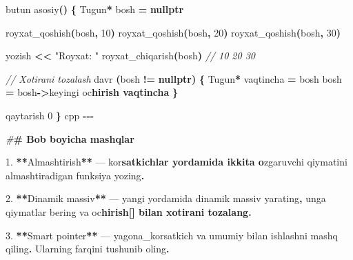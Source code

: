 \documentclass[a4paper,11pt,twoside,openright]{book}
\newenvironment{Shaded}{\begin{snugshade}}{\end{snugshade}}
\newcommand{\CharTok}[1]{\textcolor[rgb]{0.31,0.60,0.02}{#1}}
\newcommand{\CommentTok}[1]{\textcolor[rgb]{0.56,0.35,0.01}{\textit{#1}}}
\newcommand{\DecValTok}[1]{\textcolor[rgb]{0.00,0.00,0.81}{#1}}
\newcommand{\ErrorTok}[1]{\textcolor[rgb]{0.64,0.00,0.00}{\textbf{#1}}}
\newcommand{\FloatTok}[1]{\textcolor[rgb]{0.00,0.00,0.81}{#1}}
\newcommand{\KeywordTok}[1]{\textcolor[rgb]{0.13,0.29,0.53}{\textbf{#1}}}
\newcommand{\NormalTok}[1]{#1}
\newcommand{\OperatorTok}[1]{\textcolor[rgb]{0.81,0.36,0.00}{\textbf{#1}}}
\newcommand{\PreprocessorTok}[1]{\textcolor[rgb]{0.56,0.35,0.01}{\textit{#1}}}
\newcommand{\StringTok}[1]{\textcolor[rgb]{0.31,0.60,0.02}{#1}}
\begin{document}
\begin{Shaded}
\begin{Highlighting}[]
\NormalTok{butun asosiy}\OperatorTok{()} \OperatorTok{\{}
\NormalTok{    Tugun}\OperatorTok{*}\NormalTok{ bosh }\OperatorTok{=} \KeywordTok{nullptr}

\NormalTok{    royxat\_qoshish}\OperatorTok{(}\NormalTok{bosh}\OperatorTok{,} \DecValTok{10}\OperatorTok{)}
\NormalTok{    royxat\_qoshish}\OperatorTok{(}\NormalTok{bosh}\OperatorTok{,} \DecValTok{20}\OperatorTok{)}
\NormalTok{    royxat\_qoshish}\OperatorTok{(}\NormalTok{bosh}\OperatorTok{,} \DecValTok{30}\OperatorTok{)}

\NormalTok{    yozish }\OperatorTok{\textless{}\textless{}} \StringTok{"Ro\textquotesingle{}yxat: "}
\NormalTok{    royxat\_chiqarish}\OperatorTok{(}\NormalTok{bosh}\OperatorTok{)}   \CommentTok{// 10 20 30}

    \CommentTok{// Xotirani tozalash}
\NormalTok{    davr }\OperatorTok{(}\NormalTok{bosh }\OperatorTok{!=} \KeywordTok{nullptr}\OperatorTok{)} \OperatorTok{\{}
\NormalTok{        Tugun}\OperatorTok{*}\NormalTok{ vaqtincha }\OperatorTok{=}\NormalTok{ bosh}
\NormalTok{        bosh }\OperatorTok{=}\NormalTok{ bosh}\OperatorTok{{-}\textgreater{}}\NormalTok{keyingi}
\NormalTok{        o}\CharTok{\textquotesingle{}c}\ErrorTok{hirish vaqtincha}
    \OperatorTok{\}}

\NormalTok{    qaytarish }\DecValTok{0}
\OperatorTok{\}}
\ErrorTok{\textasciigrave{}\textasciigrave{}\textasciigrave{}}\NormalTok{cpp}
\OperatorTok{{-}{-}{-}}

\PreprocessorTok{\#}\ErrorTok{\# Bob bo\textquotesingle{}yicha mashqlar}

\FloatTok{1.} \OperatorTok{**}\NormalTok{Almashtirish}\OperatorTok{**}\NormalTok{ — ko}\CharTok{\textquotesingle{}r}\ErrorTok{satkichlar yordamida ikkita o}\CharTok{\textquotesingle{}}\NormalTok{zgaruvchi qiymatini almashtiradigan funksiya yozing}\OperatorTok{.}

\FloatTok{2.} \OperatorTok{**}\NormalTok{Dinamik massiv}\OperatorTok{**}\NormalTok{ — }\ErrorTok{\textasciigrave{}}\NormalTok{yangi}\ErrorTok{\textasciigrave{}}\NormalTok{ yordamida dinamik massiv yarating}\OperatorTok{,}\NormalTok{ unga qiymatlar bering va }\ErrorTok{\textasciigrave{}}\NormalTok{o}\CharTok{\textquotesingle{}c}\ErrorTok{hirish[]\textasciigrave{} bilan xotirani tozalang.}

\FloatTok{3.} \OperatorTok{**}\NormalTok{Smart pointer}\OperatorTok{**}\NormalTok{ — }\ErrorTok{\textasciigrave{}}\NormalTok{yagona\_korsatkich}\ErrorTok{\textasciigrave{}}\NormalTok{ va }\ErrorTok{\textasciigrave{}}\NormalTok{umumiy}\ErrorTok{\textasciigrave{}}\NormalTok{ bilan ishlashni mashq qiling}\OperatorTok{.}\NormalTok{ Ularning farqini tushunib oling}\OperatorTok{.}


\end{Highlighting}
\end{Shaded}
\end{document}
